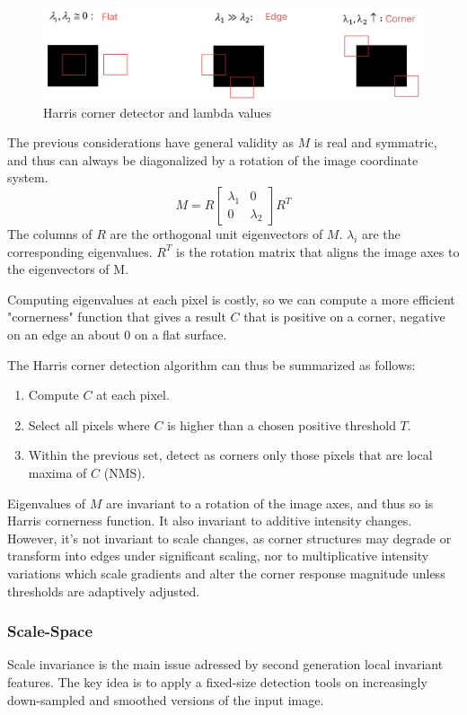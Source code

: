 \documentclass{article}
\begin{document}
\begin{figure}[htbp]
  \centering
  \includegraphics[width=0.7\linewidth]{./img/harris_corner_detector.jpg}
  \caption{Harris corner detector and lambda values}
  \label{fig:harris_corner_detector}
\end{figure}

The previous considerations have general validity as $M$ is real and symmatric, and thus can always be diagonalized by a rotation of the image coordinate system.
$$M = R\begin{bmatrix} \lambda_1 & 0 \\ 0 & \lambda_2 \end{bmatrix}R^T$$
The columns of $R$ are the orthogonal unit eigenvectors of $M$.
$\lambda_i$ are the corresponding eigenvalues.
$R^T$ is the rotation matrix that aligns the image axes to the eigenvectors of M.

Computing eigenvalues at each pixel is costly, so we can compute a more efficient "cornerness" function that gives a result $C$ that is positive on a corner, negative on an edge an about 0 on a flat surface.

The Harris corner detection algorithm can thus be summarized as follows:
\begin{enumerate}
  \item Compute $C$ at each pixel.
  \item Select all pixels where $C$ is higher than a chosen positive threshold $T$.
  \item Within the previous set, detect as corners only those pixels that are local maxima of $C$ (NMS).
\end{enumerate}

Eigenvalues of $M$ are invariant to a rotation of the image axes, and thus so is Harris cornerness function.
It also invariant to additive intensity changes.
However, it's not invariant to scale changes, as corner structures may degrade or transform into edges under significant scaling, nor to multiplicative intensity variations which scale gradients and alter the corner response magnitude unless thresholds are adaptively adjusted.

\subsubsection{Scale-Space}
Scale invariance is the main issue adressed by second generation local invariant features.
The key idea is to apply a fixed-size detection tools on increasingly down-sampled and smoothed versions of the input image.
\end{document}
